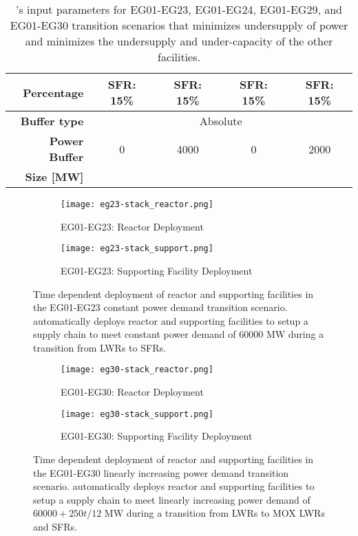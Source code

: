 \begin{table}[]
{\begin{tabular}{r|cccc}
	\textbf{Percentage} &SFR: 15\%&SFR: 15\%&SFR: 15\%&SFR: 15\%\\ \hline
	\textbf{Buffer type}                                                    & \multicolumn{4}{c}{Absolute}                                                                                                                                                                                                                                                               \\ \hline
	\textbf{Power Buffer}                                                  & 0 & 4000 & 0 & 2000 \\ 
	\textbf{Size [MW]} \\ \hline \end{tabular}}
	\caption{\deploy's input parameters for EG01-EG23, EG01-EG24, EG01-EG29, and 
	EG01-EG30 transition scenarios
	that minimizes undersupply of power and minimizes 
	the undersupply and under-capacity of the other facilities. }
	\label{tab:bestinputs}
	\end{table}

\begin{figure}[]
	\centering
	\begin{subfigure}[t]{1\textwidth}
		\centering
		\texttt{[image: eg23-stack\_reactor.png]} 
		\caption{EG01-EG23: Reactor Deployment}
		\label{fig:23reactor}
	\end{subfigure}
	\begin{subfigure}[t]{1\textwidth}
		\centering
		\texttt{[image: eg23-stack\_support.png]} 
		\caption{EG01-EG23: Supporting Facility Deployment}
		\label{fig:23support}
	\end{subfigure}
	\hfill
	\caption{Time dependent deployment of reactor and supporting facilities in 
	the EG01-EG23 constant power demand transition scenario. 
	\deploy automatically deploys reactor and supporting facilities 
	to setup a supply chain to meet constant power demand of $60000$ MW
	during a transition from \glspl{LWR} to \glspl{SFR}. }
	\label{fig:23stack}
\end{figure}

\begin{figure}[]
	\centering
	\begin{subfigure}[t]{1\textwidth}
		\centering
		\texttt{[image: eg30-stack\_reactor.png]} 
		\caption{EG01-EG30: Reactor Deployment}
		\label{fig:30reactor}
	\end{subfigure}
	\begin{subfigure}[t]{1\textwidth}
		\centering
		\texttt{[image: eg30-stack\_support.png]} 
		\caption{EG01-EG30: Supporting Facility Deployment}
		\label{fig:30support}
	\end{subfigure}
	\hfill
	\caption{Time dependent deployment of reactor and supporting facilities in 
	the EG01-EG30 linearly increasing power demand transition scenario. 
	\deploy automatically deploys reactor and supporting facilities 
	to setup a supply chain to meet linearly increasing power demand of $60000 + 250t/12$ MW
	during a transition from \glspl{LWR} to MOX LWRs and \glspl{SFR}. }
	\label{fig:30stack}
\end{figure}
